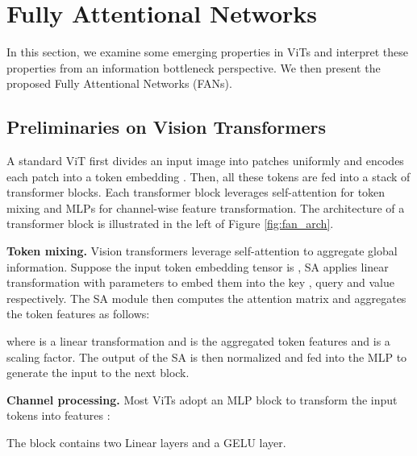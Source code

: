 \documentclass[nohyperref]{article}
\theoremstyle{plain}
\theoremstyle{definition}
\theoremstyle{remark}
\begin{document}
 \section{Fully Attentional Networks}

In this section, we examine some emerging properties in ViTs and interpret these properties from an information bottleneck perspective. We then present the proposed Fully Attentional Networks (FANs).

\subsection{Preliminaries on Vision Transformers}
A standard ViT  first divides an input image into   patches uniformly and
encodes each patch into a token embedding . 
Then, all these tokens  are fed into a stack of transformer blocks. 
Each transformer block leverages self-attention for token mixing and MLPs for channel-wise feature transformation. The architecture of a transformer block is illustrated in the left of Figure \ref{fig:fan_arch}.

\textbf{Token mixing.} Vision transformers leverage self-attention to aggregate global information. Suppose the input token embedding tensor is , SA applies linear transformation with parameters  to embed them into the key , query  and value  respectively. The SA module then computes the   attention  matrix and aggregates the token features as follows:

\vspace{-0.2cm}
\begin{small}

\end{small}

\vspace{-0.3cm}
where  is a linear transformation and  is the aggregated token features and  is a scaling factor. The output of the SA is then normalized and   fed into the MLP to generate the input to the next block. 

\textbf{Channel processing.} Most ViTs adopt an MLP block to transform the input tokens into features :

\vspace{-0.2cm}
\begin{small}

\end{small}

\vspace{-0.5cm}
The block contains two Linear layers and a GELU layer.
\end{document}

